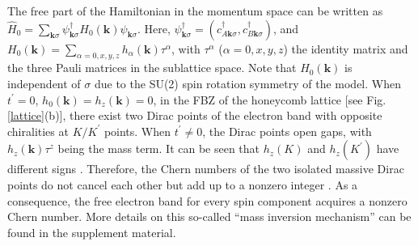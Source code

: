 \documentclass[amsmath,superscriptaddress,showpacs,aps,prl,twocolumn]{revtex4-1}
\begin{document}
\par The free part of the Hamiltonian in the momentum space can be written as $\hat{H}_0=\sum_{\mathbf{k}\sigma}\psi^{\dagger}_{\mathbf{k}\sigma}H_0(\mathbf{k})\psi_{\mathbf{k}\sigma}$. Here, $\psi^{\dagger}_{\mathbf{k}\sigma}=(c^{\dagger}_{A\mathbf{k}\sigma},c^{\dagger}_{B\mathbf{k}\sigma})$, and $H_0(\mathbf{k})=\sum_{\alpha=0,x,y,z}h_\alpha(\mathbf{k})\tau^\alpha$, with $\tau^\alpha$ ($\alpha=0,x,y,z$) the identity matrix and the three Pauli matrices in the sublattice space. Note that $H_0(\mathbf{k})$ is independent of $\sigma$ due to the SU(2) spin rotation symmetry of the model. When $t^\prime=0$, $h_0(\mathbf{k})=h_z(\mathbf{k})=0$, in the FBZ of the honeycomb lattice [see Fig. \ref{lattice}(b)], there exist two Dirac points of the electron band with opposite chiralities at $K/K^\prime$ points. When $t^\prime\ne0$, the Dirac points open gaps, with $h_z(\mathbf{k})\tau^z$ being the mass term. It can be seen that $h_z(K)$ and $h_z(K^\prime)$ have different signs \cite{Haldane_PRL1988}. Therefore, the Chern numbers of the two isolated massive Dirac points do not cancel each other but add up to a nonzero integer \cite{Rachel_RPP2018}. As a consequence, the free electron band for every spin component acquires a nonzero Chern number. More details on this so-called ``mass inversion mechanism'' can be found in the supplement material.
\end{document}
